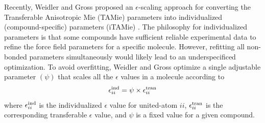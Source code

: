 \documentclass[journal=jced,manuscript=article]{achemso}
\begin{document}
Recently, Weidler and Gross proposed an $\epsilon$-scaling approach for converting the Transferable Anisotropic Mie (TAMie)\cite{TAMie} parameters into individualized (compound-specific) parameters (iTAMie) \cite{Weidler2018}. The philosophy for individualized parameters is that some compounds have sufficient reliable experimental data to refine the force field parameters for a specific molecule. However, refitting all non-bonded parameters simultaneously would likely lead to an underspecificed optimization. To avoid overfitting, Weidler and Gross optimize a single adjustable parameter $(\psi)$ that scales all the $\epsilon$ values in a molecule according to
\begin{equation}
\epsilon_{ii}^{\rm ind} = \psi \times \epsilon_{ii}^{\rm tran}
\end{equation}
where $\epsilon_{ii}^{\rm ind}$ is the individualized $\epsilon$ value for united-atom $ii$, $\epsilon_{ii}^{\rm tran}$ is the corresponding transferable $\epsilon$ value, and $\psi$ is a fixed value for a given compound.





\end{document}

